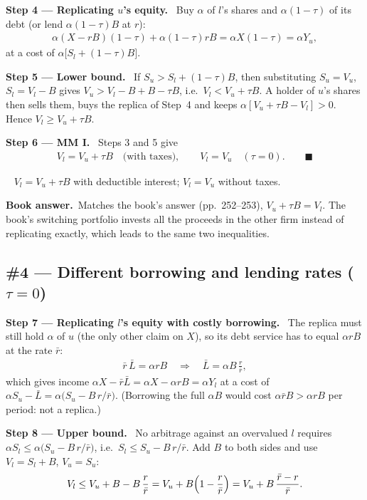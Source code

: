 \documentclass[11pt,a4paper]{article}
\numberwithin{equation}{section}
\newcommand{\step}[2]{\par\smallskip\noindent\textbf{Step #1 --- #2.}~}
\newcommand{\bookans}{\par\smallskip\noindent\textbf{Book answer.}~}
\newcommand{\answer}[1]{\par\smallskip\noindent\fbox{\textbf{Answer #1.}}~}
\begin{document}
\step{4}{Replicating $u$'s equity} Buy $\alpha$ of $l$'s shares and $\alpha(1-\tau)$ of its debt (or lend $\alpha(1-\tau)B$ at $r$):
\begin{align}
  \alpha(X-rB)(1-\tau)+\alpha(1-\tau)rB = \alpha X(1-\tau) = \alpha Y_u, \nonumber
\end{align}
at a cost of $\alpha\bigl[S_l+(1-\tau)B\bigr]$.

\step{5}{Lower bound} If $S_u>S_l+(1-\tau)B$, then substituting $S_u=V_u$, $S_l=V_l-B$ gives
$V_u>V_l-B+B-\tau B$, i.e.\ $V_l<V_u+\tau B$. A holder of $u$'s shares then sells them,
buys the replica of Step~4 and keeps $\alpha[V_u+\tau B-V_l]>0$. Hence $V_l\ge V_u+\tau B$.

\step{6}{MM I} Steps 3 and 5 give
\begin{align}
  V_l = V_u + \tau B \quad\text{(with taxes)}, \qquad V_l = V_u \quad (\tau=0). \qquad\blacksquare \label{eq:15MM1}
\end{align}
\answer{(\#3)} $V_l=V_u+\tau B$ with deductible interest; $V_l=V_u$ without taxes.

\bookans Matches the book's answer (pp.~252--253), $V_u+\tau B=V_l$. The book's switching
portfolio invests all the proceeds in the other firm instead of replicating exactly, which leads
to the same two inequalities.

\subsection*{\#4 --- Different borrowing and lending rates ($\tau=0$)}

\step{7}{Replicating $l$'s equity with costly borrowing} The replica must still hold $\alpha$ of $u$
(the only other claim on $X$), so its debt service has to equal $\alpha rB$ at the rate $\bar r$:
\begin{align}
  \bar r\,\bar L = \alpha rB \quad\Longrightarrow\quad \bar L = \alpha B\,\frac{r}{\bar r}, \label{eq:15Lbar}
\end{align}
which gives income $\alpha X-\bar r\bar L=\alpha X-\alpha rB=\alpha Y_l$ at a cost of
$\alpha S_u-\bar L=\alpha\bigl(S_u-B\,r/\bar r\bigr)$.
(Borrowing the full $\alpha B$ would cost $\alpha\bar rB>\alpha rB$ per period: not a replica.)

\step{8}{Upper bound} No arbitrage against an overvalued $l$ requires
$\alpha S_l\le\alpha\bigl(S_u-B\,r/\bar r\bigr)$, i.e.\ $S_l\le S_u-B\,r/\bar r$. Add $B$ to both
sides and use $V_l=S_l+B$, $V_u=S_u$:
\begin{align}
  V_l \le V_u + B - B\,\frac{r}{\bar r} = V_u + B\Bigl(1-\frac{r}{\bar r}\Bigr) = V_u + B\,\frac{\bar r-r}{\bar r}. \label{eq:15up}
\end{align}
\end{document}
